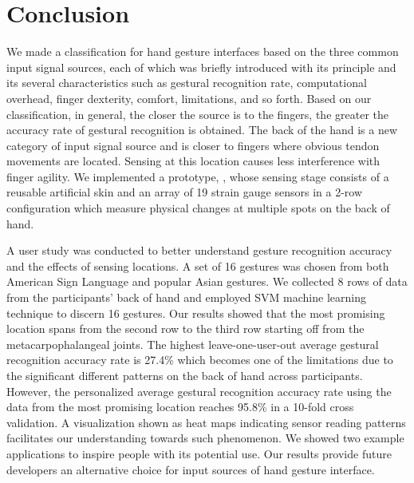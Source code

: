 \documentclass{sigchi}
\begin{document}
\section{Conclusion}
We made a classification for hand gesture interfaces based on the three common input signal sources, each of which was briefly introduced with its principle and its several characteristics such as gestural recognition rate, computational overhead, finger dexterity, comfort, limitations, and so forth. Based on our classification, in general, the closer the source is to the fingers, the greater the accuracy rate of gestural recognition is obtained.
The back of the hand is a new category of input signal source and is closer to fingers where obvious tendon movements are located. Sensing at this location causes less interference with finger agility. We implemented a prototype, \getTitleName, whose sensing stage consists of a reusable artificial skin and an array of 19 strain gauge sensors in a 2-row configuration which measure physical changes at multiple spots on the back of hand.

A user study was conducted to better understand gesture recognition accuracy and the effects of sensing locations. A set of 16 gestures was chosen from both American Sign Language and popular Asian gestures. We collected 8 rows of data from the participants' back of hand and employed SVM machine learning technique to discern 16 gestures. Our results showed that the most promising location spans from the second row to the third row starting off from the metacarpophalangeal joints. The highest leave-one-user-out average gestural recognition accuracy rate is 27.4\% which becomes one of the limitations due to the significant different patterns on the back of hand across participants. However, the personalized average gestural recognition accuracy rate using the data from the most promising location reaches 95.8\% in a 10-fold cross validation. A visualization shown as heat maps indicating sensor reading patterns facilitates our understanding towards such phenomenon. We showed two example applications to inspire people with its potential use.
Our results provide future developers an alternative choice for input sources of hand gesture interface. 

\end{document}
